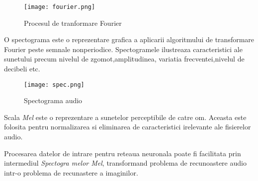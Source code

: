 \documentclass[a4paper]{article}
\begin{document}
\begin{figure}[H]
	\centering
	\texttt{[image: fourier.png]}
	\caption{Procesul de tranformare Fourier}
\label{result2}
\end{figure}


O spectograma este o reprezentare grafica a aplicarii algoritmului de transformare Fourier peste semnale
nonperiodice. Spectogramele ilustreaza caracteristici ale sunetului precum nivelul de zgomot,amplitudinea,
variatia frecventei,nivelul de decibeli etc.



\begin{figure}[H]
	\centering
	\texttt{[image: spec.png]}
	\caption{Spectograma audio}
\label{result3}
\end{figure}


Scala \textit{Mel} este o reprezentare a sunetelor perceptibile de catre om. Aceasta este folosita pentru
normalizarea si eliminarea de caracteristici irelevante ale fisierelor audio.


Procesarea datelor de intrare pentru reteaua neuronala poate fi facilitata prin intermediul \textit{Spectogra
melor Mel}, transformand problema de recunoastere audio intr-o problema de recunastere a imaginilor.

\nocite{*}
\printbibliography[title=Bibliografie]
\end{document}
